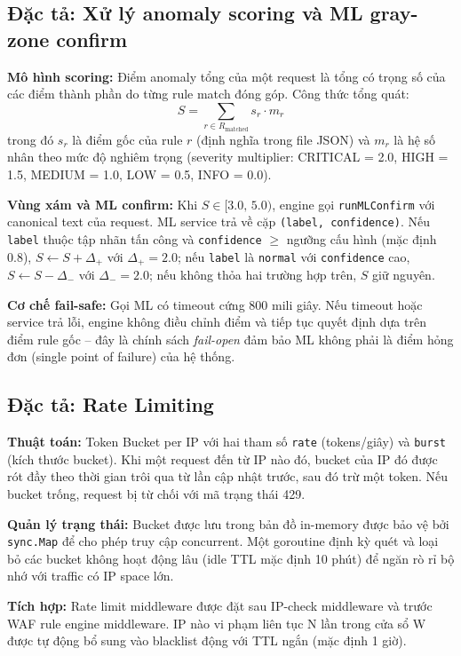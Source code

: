 \documentclass[../DoAn.tex]{subfiles}
\begin{document}
\subsection{Đặc tả: Xử lý anomaly scoring và ML gray-zone confirm}
\label{subsection:2.3.2}

\textbf{Mô hình scoring:} Điểm anomaly tổng của một request là tổng có trọng số
của các điểm thành phần do từng rule match đóng góp. Công thức tổng quát:
\[
S = \sum_{r \in R_{\text{matched}}} s_r \cdot m_r
\]
trong đó \(s_r\) là điểm gốc của rule \(r\) (định nghĩa trong file JSON) và
\(m_r\) là hệ số nhân theo mức độ nghiêm trọng (severity multiplier:
CRITICAL = 2.0, HIGH = 1.5, MEDIUM = 1.0, LOW = 0.5, INFO = 0.0).

\textbf{Vùng xám và ML confirm:} Khi \(S \in [3.0,\, 5.0)\), engine gọi
\texttt{runMLConfirm} với canonical text của request. ML service trả về cặp
\texttt{(label, confidence)}. Nếu \texttt{label} thuộc tập nhãn tấn công và
\texttt{confidence} \(\ge\) ngưỡng cấu hình (mặc định 0.8), \(S \leftarrow S
+ \Delta_+\) với \(\Delta_+ = 2.0\); nếu \texttt{label} là \texttt{normal} với
\texttt{confidence} cao, \(S \leftarrow S - \Delta_-\) với \(\Delta_- = 2.0\);
nếu không thỏa hai trường hợp trên, \(S\) giữ nguyên.

\textbf{Cơ chế fail-safe:} Gọi ML có timeout cứng 800 mili giây. Nếu timeout
hoặc service trả lỗi, engine không điều chỉnh điểm và tiếp tục quyết định dựa
trên điểm rule gốc -- đây là chính sách \textit{fail-open} đảm bảo ML không
phải là điểm hỏng đơn (single point of failure) của hệ thống.

\subsection{Đặc tả: Rate Limiting}
\label{subsection:2.3.3}

\textbf{Thuật toán:} Token Bucket per IP với hai tham số \texttt{rate}
(tokens/giây) và \texttt{burst} (kích thước bucket). Khi một request đến từ IP
nào đó, bucket của IP đó được rót đầy theo thời gian trôi qua từ lần cập nhật
trước, sau đó trừ một token. Nếu bucket trống, request bị từ chối với mã
trạng thái 429.

\textbf{Quản lý trạng thái:} Bucket được lưu trong bản đồ in-memory được bảo vệ
bởi \texttt{sync.Map} để cho phép truy cập concurrent. Một goroutine định kỳ
quét và loại bỏ các bucket không hoạt động lâu (idle TTL mặc định 10 phút) để
ngăn rò rỉ bộ nhớ với traffic có IP space lớn.

\textbf{Tích hợp:} Rate limit middleware được đặt sau IP-check middleware và
trước WAF rule engine middleware. IP nào vi phạm liên tục N lần trong cửa sổ
W được tự động bổ sung vào blacklist động với TTL ngắn (mặc định 1 giờ).
\end{document}
